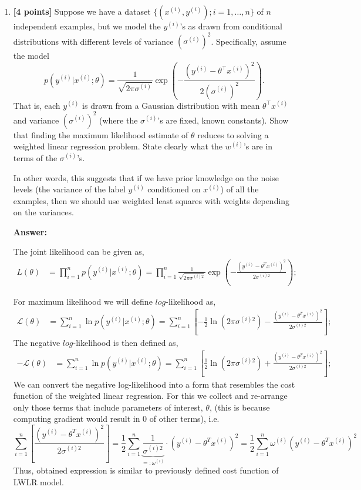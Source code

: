 \documentclass{article}
\begin{document}
\begin{enumerate}[label=\alph*)]
\begin{enumerate}[label=(\roman*.)]
\item \textbf{[4 points]} Suppose we have a dataset $\{(x^{(i)}, y^{(i)}); i = 1, \ldots, n\}$ of $n$ independent examples, but we model the $y^{(i)}$'s as drawn from conditional distributions with different levels of variance $(\sigma^{(i)})^2$. Specifically, assume the model
\[ p(y^{(i)}|x^{(i)}; \theta) = \frac{1}{\sqrt{2\pi\sigma^{(i)}}} \exp\left(-\frac{(y^{(i)} - \theta^\top x^{(i)})^2}{2(\sigma^{(i)})^2}\right). \]
That is, each $y^{(i)}$ is drawn from a Gaussian distribution with mean $\theta^\top x^{(i)}$ and variance $(\sigma^{(i)})^2$ (where the $\sigma^{(i)}$'s are fixed, known constants). Show that finding the maximum likelihood estimate of $\theta$ reduces to solving a weighted linear regression problem. State clearly what the $w^{(i)}$'s are in terms of the $\sigma^{(i)}$'s.

In other words, this suggests that if we have prior knowledge on the noise levels (the variance of the label $y^{(i)}$ conditioned on $x^{(i)}$) of all the examples, then we should use weighted least squares with weights depending on the variances.

\textbf{Answer:}

The joint likelihood can be given as,
\begin{align*}
L(\theta) &= \prod_{i=1}^{n} p(y^{(i)}|x^{(i)}; \theta) = \prod_{i=1}^{n} \frac{1}{\sqrt{2\pi\sigma^{(i)2}}} \exp\left(-\frac{(y^{(i)} - \theta^T x^{(i)})^2}{2\sigma^{(i)2}}\right);
\end{align*}

For maximum likelihood we will define $log$-likelihood as,
\begin{align*}
\mathscr{L}(\theta) &= \sum_{i=1}^{n} \ln p(y^{(i)}|x^{(i)}; \theta) =\sum_{i=1}^{n} \left[ -\frac{1}{2}\ln(2\pi\sigma^{(i)2}) - \frac{(y^{(i)} - \theta^T x^{(i)})^2}{2\sigma^{(i)2}} \right];
\end{align*}
The negative $log$-likelihood is then defined as,
\begin{align*}
-\mathscr{L}(\theta) &= \sum_{i=1}^{n} \ln p(y^{(i)}|x^{(i)}; \theta) =\sum_{i=1}^{n} \left[\frac{1}{2}\ln(2\pi\sigma^{(i)2}) + \frac{(y^{(i)} - \theta^T x^{(i)})^2}{2\sigma^{(i)2}} \right];
\end{align*}
We can convert the negative log-likelihood into a form that resembles the cost function of the weighted linear regression. For this we collect and re-arrange only those terms that include parameters of interest, $\theta$, (this is because computing gradient would result in 0 of other terms), i.e. 
\[
\sum_{i=1}^{n} \left[\frac{(y^{(i)} - \theta^T x^{(i)})^2}{2\sigma^{(i)2}} \right] = \frac{1}{2}\sum_{i=1}^{n}\underbrace{ \frac{1}{\sigma^{(i)2}}}_{=:\omega^{(i)} }\cdot (y^{(i)} - \theta^T x^{(i)})^2 = \frac{1}{2} \sum_{i=1}^{n}\omega^{(i)} (y^{(i)} - \theta^T x^{(i)})^2 
\]
Thus, obtained expression is similar to previously defined cost function of LWLR model.


\end{enumerate}
\end{enumerate}
\end{document}

